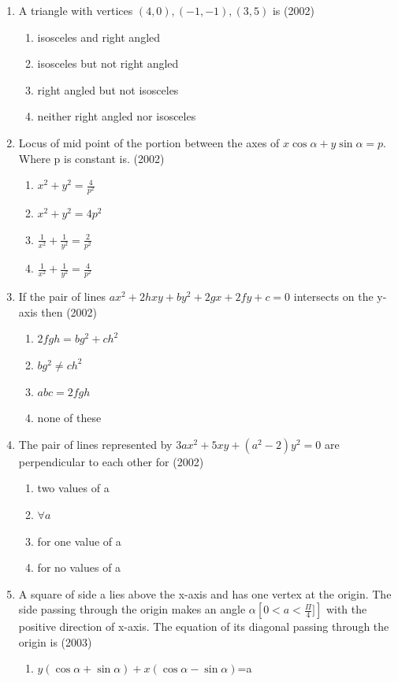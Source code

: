\documentclass[12pt]{article}
\providecommand{\brak}[1]{\ensuremath{\left(#1\right)}}
\begin{document}
\begin{enumerate}
		\fi
\item A triangle with vertices $(4,0),(-1,-1 ),(3,5)$ is (2002)
\begin{enumerate}
\item isosceles and right angled
\item isosceles  but not right angled
\item right angled but not isosceles 
\item neither right angled nor isosceles 
\end{enumerate}
\item Locus of mid point of the portion between the axes of $x\cos\alpha+y\sin\alpha=p$. Where p is constant is. (2002)
\begin{enumerate}
\item $x^2+y^2=\frac{4}{p^2}$ 
\item $x^2+y^2=4p^2$
\item$\frac{1}{x^2}+\frac{1}{y^2}=\frac{2}{p^2}$ 
\item $\frac{1}{x^2}+\frac{1}{y^2}=\frac{4}{p^2}$ 
\end{enumerate}
\item If the pair of lines $ax^2+2hxy+by^2+2gx+2fy+c=0$ intersects on the y-axis then (2002)
\begin{enumerate}
\item $2fgh=bg^2+ch^2$ 
\item $bg^2\neq ch^2$
\item $abc=2fgh$
\item none of these
\end{enumerate}
\item The pair of lines represented by $3ax^2+5xy+(a^2-2)y^2=0$ are perpendicular to each other for (2002)
\begin{enumerate}
\item two values of a 
\item $\forall a$
\item for one value of a 
\item for no values of a
\end{enumerate}
\item A square of side a lies above the x-axis and has one vertex at the origin. The side passing through the origin makes an angle $\alpha \left[ 0<a<\frac{\Pi}{4}]\right]$ with the positive direction of x-axis. The equation of its diagonal passing through the origin is (2003)
\begin{enumerate}
\item $y\brak{\cos\alpha+\sin\alpha}+x\brak{\cos\alpha-\sin\alpha}$=a

\end{enumerate}
\end{enumerate}
\end{document}
